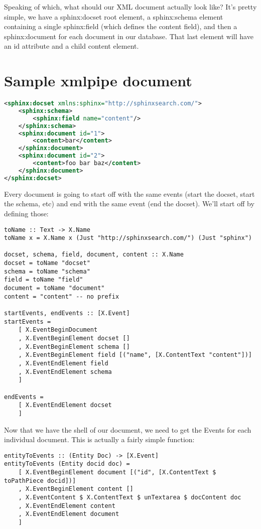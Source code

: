 Speaking of which, what should our XML document actually look like? It's pretty simple, we have a sphinx:docset root element, a sphinx:schema element containing a single sphinx:field (which defines the content field), and then a sphinx:document for each document in our database. That last element will have an id attribute and a child content element.

\section{Sample xmlpipe document} %

\begin{lstlisting}[language=XML]
<sphinx:docset xmlns:sphinx="http://sphinxsearch.com/">
    <sphinx:schema>
        <sphinx:field name="content"/>
    </sphinx:schema>
    <sphinx:document id="1">
        <content>bar</content>
    </sphinx:document>
    <sphinx:document id="2">
        <content>foo bar baz</content>
    </sphinx:document>
</sphinx:docset>
\end{lstlisting}

Every document is going to start off with the same events (start the docset, start the schema, etc) and end with the same event (end the docset). We'll start off by defining those:

\begin{lstlisting}
toName :: Text -> X.Name
toName x = X.Name x (Just "http://sphinxsearch.com/") (Just "sphinx")

docset, schema, field, document, content :: X.Name
docset = toName "docset"
schema = toName "schema"
field = toName "field"
document = toName "document"
content = "content" -- no prefix

startEvents, endEvents :: [X.Event]
startEvents =
    [ X.EventBeginDocument
    , X.EventBeginElement docset []
    , X.EventBeginElement schema []
    , X.EventBeginElement field [("name", [X.ContentText "content"])]
    , X.EventEndElement field
    , X.EventEndElement schema
    ]

endEvents =
    [ X.EventEndElement docset
    ]
\end{lstlisting}

Now that we have the shell of our document, we need to get the Events for each individual document. This is actually a fairly simple function:

\begin{lstlisting}
entityToEvents :: (Entity Doc) -> [X.Event]
entityToEvents (Entity docid doc) =
    [ X.EventBeginElement document [("id", [X.ContentText $ toPathPiece docid])]
    , X.EventBeginElement content []
    , X.EventContent $ X.ContentText $ unTextarea $ docContent doc
    , X.EventEndElement content
    , X.EventEndElement document
    ]
\end{lstlisting}

